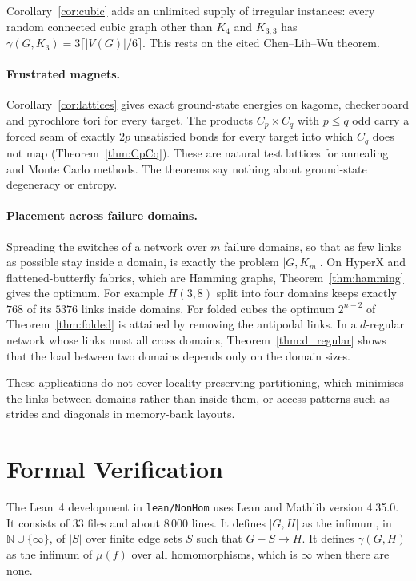 \documentclass{article}
\theoremstyle{definition}
\begin{document}
Corollary~\ref{cor:cubic} adds an unlimited supply of irregular instances:
every random connected cubic graph other than $K_4$ and $K_{3,3}$ has
$\gamma(G,K_3)=3\lceil|V(G)|/6\rceil$.  This rests on the cited Chen--Lih--Wu
theorem.

\paragraph{Frustrated magnets.}
Corollary~\ref{cor:lattices} gives exact ground-state energies on kagome,
checkerboard and pyrochlore tori for every target.  The products
$C_p\times C_q$ with $p\le q$ odd carry a forced seam of exactly $2p$ unsatisfied
bonds for every target into which $C_q$ does not map (Theorem~\ref{thm:CpCq}).
These are natural test lattices for annealing and Monte Carlo methods.  The
theorems say nothing about ground-state degeneracy or entropy.

\paragraph{Placement across failure domains.}
Spreading the switches of a network over $m$ failure domains, so that as few
links as possible stay inside a domain, is exactly the problem $|G,K_m|$.  On
HyperX and flattened-butterfly fabrics, which are Hamming graphs,
Theorem~\ref{thm:hamming} gives the optimum.  For example $H(3,8)$ split into four
domains keeps exactly $768$ of its $5376$ links inside domains.  For folded cubes
the optimum $2^{n-2}$ of Theorem~\ref{thm:folded} is attained by removing the
antipodal links.  In a $d$-regular network whose links must all cross domains,
Theorem~\ref{thm:d_regular} shows that the load between two domains depends only on
the domain sizes.

These applications do not cover locality-preserving partitioning, which minimises
the links between domains rather than inside them, or access patterns such as
strides and diagonals in memory-bank layouts.

\section{Formal Verification}
\label{sec:formal}

The Lean~4 development in \texttt{lean/NonHom} uses Lean and Mathlib version
4.35.0.  It consists of 33 files and about 8\,000 lines.  It defines $|G,H|$ as
the infimum, in $\mathbb N\cup\{\infty\}$, of $|S|$ over finite edge sets $S$ such
that $G-S\to H$.  It defines $\gamma(G,H)$ as the infimum of $\mu(f)$ over all
homomorphisms, which is $\infty$ when there are none.
\end{document}
